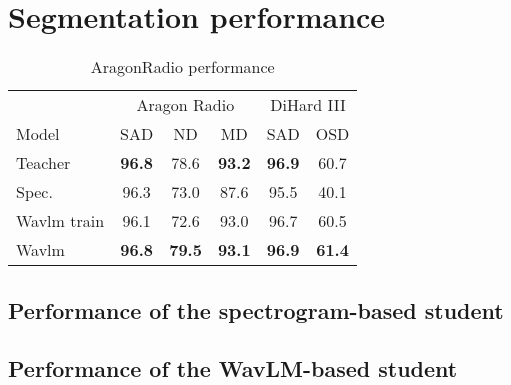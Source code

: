 \section{Segmentation performance}
\label{sect:perf}

\begin{table}[ht]
    \centering
    \begin{tabular}{lccccc}
        \toprule
         & \multicolumn{3}{c}{Aragon Radio} & \multicolumn{2}{c}{DiHard III} \\
         \cmidrule{2-4}
         \cmidrule{5-6}
         Model & SAD & ND & MD & SAD & OSD \\  
         \midrule
         Teacher & \textbf{96.8} & 78.6 & \textbf{93.2} & \textbf{96.9} & 60.7\\
         \midrule
         Spec. & 96.3 & 73.0 &  87.6 & 95.5 & 40.1\\
         Wavlm train & 96.1 & 72.6 & 93.0 & 96.7 & 60.5\\
         Wavlm & \textbf{96.8} & \textbf{79.5} & \textbf{93.1} & \textbf{96.9} & \textbf{61.4} \\
         \bottomrule
    \end{tabular}
    \caption{AragonRadio performance}
    \label{tab:seg_results}
\end{table}


\subsection{Performance of the spectrogram-based student}



\subsection{Performance of the WavLM-based student}


